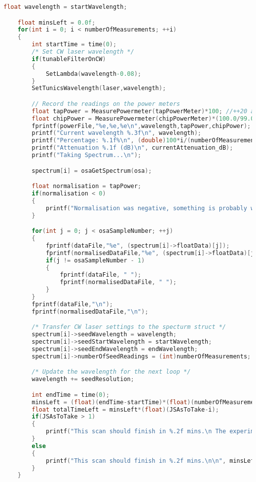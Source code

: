\begin{lstlisting}[style=customc, language=C]
    float wavelength = startWavelength;

    float minsLeft = 0.0f;
    for(int i = 0; i < numberOfMeasurements; ++i)
    {
        int startTime = time(0);
        /* Set CW laser wavelength */
        if(tunableFilterOnCW)
        {
            SetLambda(wavelength-0.08);
        }
        SetTunicsWavelength(laser,wavelength);

        // Record the readings on the power meters
        float tapPower = MeasurePowermeter(tapPowerMeter)*100; //++20 accounts for the tapping
        float chipPower = MeasurePowermeter(chipPowerMeter)*(100.0/99.0);
        fprintf(powerFile,"%e,%e,%e\n",wavelength,tapPower,chipPower);
        printf("Current wavelength %.3f\n", wavelength);
        printf("Percentage: %.1f%\n", (double)100*i/(numberOfMeasurements-1));
        printf("Attenuation %.1f (dB)\n", currentAttenuation_dB);
        printf("Taking Spectrum...\n");

        spectrum[i] = osaGetSpectrum(osa);

        float normalisation = tapPower;
        if(normalisation < 0)
        {
            printf("Normalisation was negative, something is probably wrong with the set up!\n");
        }

        for(int j = 0; j < osaSampleNumber; ++j)
        {
            fprintf(dataFile,"%e", (spectrum[i]->floatData)[j]);
            fprintf(normalisedDataFile,"%e", (spectrum[i]->floatData)[j]/normalisation);
            if(j != osaSampleNumber - 1)
            {
                fprintf(dataFile, " ");
                fprintf(normalisedDataFile, " ");
            }
        }
        fprintf(dataFile,"\n");
        fprintf(normalisedDataFile,"\n");

        /* Transfer CW laser settings to the specturm struct */
        spectrum[i]->seedWavelength = wavelength;
        spectrum[i]->seedStartWavelength = startWavelength;
        spectrum[i]->seedEndWavelength = endWavelength;
        spectrum[i]->numberOfSeedReadings = (int)numberOfMeasurements;

        /* Update the wavelength for the next loop */
        wavelength += seedResolution;

        int endTime = time(0);
        minsLeft = (float)(endTime-startTime)*(float)(numberOfMeasurements-i+1+6)/(float)60;
        float totalTimeLeft = minsLeft*(float)(JSAsToTake-i);
        if(JSAsToTake > 1)
        {
            printf("This scan should finish in %.2f mins.\n The experiment should finish in %.2f mins.\n\n", minsLeft, totalTimeLeft);
        }
        else
        {
            printf("This scan should finish in %.2f mins.\n\n", minsLeft);;
        }
    }


\end{lstlisting}
